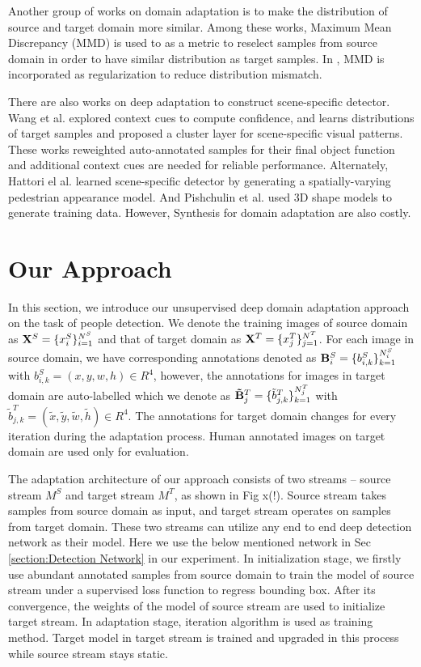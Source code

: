 \documentclass[runningheads]{llncs}
\begin{document}
Another group of works \cite{huang2006correcting,gretton2009covariate,gong2013connecting} on domain adaptation is to make the distribution of source and target domain more similar. Among these works, Maximum Mean Discrepancy (MMD) is used to as a metric to reselect samples from source domain in order to have similar distribution as target samples. In \cite{ghifary2014domain}, MMD is incorporated as regularization to reduce distribution mismatch.

There are also works on deep adaptation to construct scene-specific detector. Wang et al.\cite{wang2014scene} explored context cues to compute confidence, and \cite{zeng2014deep} learns distributions of target samples and proposed a cluster layer for scene-specific visual patterns. These works reweighted auto-annotated samples for their final object function and additional context cues are needed for reliable performance. Alternately, Hattori el al. \cite{hattori2015learning} learned scene-specific detector by generating a spatially-varying pedestrian appearance model. And Pishchulin et al. \cite{pishchulin2011learning} used 3D shape models to generate training data. However, Synthesis for domain adaptation are also costly.

\section{Our Approach}
\label{sec:Our Approach}

In this section, we introduce our unsupervised deep domain adaptation approach on the task of people detection. We denote the training images of source domain as  ${\bf X}^{S} = \{x^{S}_{i}\}^{N^{S}}_{i=1}$ and that of target domain as ${\bf X}^{T} = \{x^{T}_{j}\}^{N^{T}}_{j=1}$. For each image in source domain, we have corresponding annotations denoted as ${\bf B}^{S}_{i} = \{b^{S}_{i,k}\}^{N^{S}_{i}}_{k=1}$ with $b^{S}_{i,k} = (x,y,w,h) \in R^{4}$, however, the annotations for images in target domain are auto-labelled which we denote as ${\bf \tilde{B}}^{T}_{j} = \{\tilde{b}^{T}_{j,k}\}^{N^{T}_{j}}_{k=1}$ with $\tilde{b}^{T}_{j,k} = (\tilde{x},\tilde{y},\tilde{w},\tilde{h}) \in R^{4}$. The annotations for target domain changes for every iteration during the adaptation process. Human annotated images on target domain are used only for evaluation.

The adaptation architecture of our approach consists of two streams -- source stream $M^{S}$ and target stream $M^{T}$, as shown in Fig x(!). Source stream takes samples from source domain as input, and target stream operates on samples from target domain. These two streams can utilize any end to end deep detection network as their model. Here we use the below mentioned network in Sec \ref{section:Detection Network} in our experiment. In initialization stage, we firstly use abundant annotated samples from source domain to train the model of source stream under a supervised loss function to regress bounding box. After its convergence, the weights of the model of source stream are used to initialize target stream. In adaptation stage, iteration algorithm is used as training method. Target model in target stream is trained and upgraded in this process while source stream stays static. 
\end{document}
